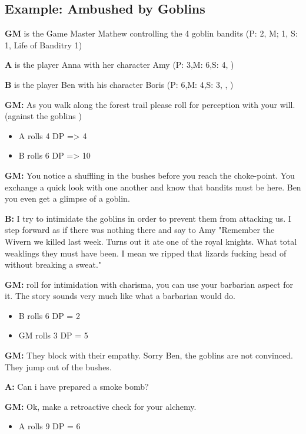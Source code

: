 \documentclass[11pt]{article}
\begin{document}
{\subsection{Example: Ambushed by Goblins}
\label{sec:org0a7758d}

\textbf{GM} is the Game Master Mathew controlling the 4 goblin bandits (P: 2, M; 1, S: 1, Life of Banditry 1)

\textbf{A} is the player Anna with her character Amy (P: 3,M: 6,S: 4, )

\textbf{B} is the player Ben with his character Boris (P: 6,M: 4,S: 3, , )

\textbf{GM:} As you walk along the forest trail please roll for perception with your will. (against the goblins ) 
\begin{itemize}
\item A rolls 4 DP => 4
\item B rolls 6 DP => 10
\end{itemize}

\textbf{GM:} You notice a shuffling in the bushes before you reach the choke-point. You exchange a quick look with one another and know that bandits must be here. Ben you even get a glimpse of a goblin.

\textbf{B:} I try to intimidate the goblins in order to prevent them from attacking us. I step forward as if there was nothing there and say to Amy "Remember the Wivern we killed last week. Turns out it ate one of the royal knights. What total weaklings they must have been. I mean we ripped that lizards fucking head of without breaking a sweat."

\textbf{GM:} roll for intimidation with charisma, you can use your barbarian aspect for it. The story sounds very much like what a barbarian would do.
\begin{itemize}
\item B rolls 6 DP = 2
\item GM rolls 3 DP = 5
\end{itemize}

\textbf{GM:} They block with their empathy. Sorry Ben, the goblins are not convinced. They jump out of the bushes.

\textbf{A:} Can i have prepared a smoke bomb?

\textbf{GM:} Ok, make a retroactive check for your alchemy.
\begin{itemize}
\item A rolls 9 DP = 6
\end{itemize}

}
\end{document}
